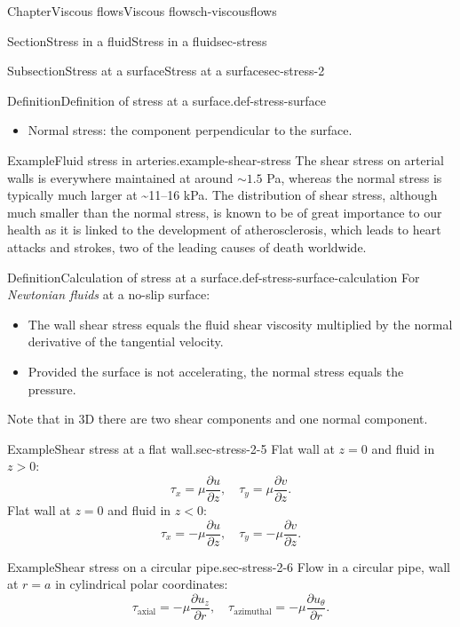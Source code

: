 \documentclass[oneside,10pt,]{book}
\newcommand{\ptxlistdisc}{\raisebox{0.3ex}{\textbullet}}
\numberwithin{equation}{section}
\newcommand{\pd}[2]{\frac{\partial#1}{\partial#2}}
\begin{document}
\begin{chapterptx}{Chapter}{Viscous flows}{}{Viscous flows}{}{}{ch-viscousflows}
\begin{sectionptx}{Section}{Stress in a fluid}{}{Stress in a fluid}{}{}{sec-stress}
\begin{subsectionptx}{Subsection}{Stress at a surface}{}{Stress at a surface}{}{}{sec-stress-2}
\begin{definition}{Definition}{Definition of stress at a surface.}{}{def-stress-surface}
\begin{itemize}[label=\ptxlistdisc]
\item{}Normal stress: the component perpendicular to the surface.%
\end{itemize}
%
\end{definition}
\begin{example}{Example}{Fluid stress in arteries.}{example-shear-stress}%
The shear stress on arterial walls is everywhere maintained at around \(\sim1.5\) Pa, whereas the normal stress is typically much larger at \textasciitilde{}11–16 kPa. The distribution of shear stress, although much smaller than the normal stress, is known to be of great importance to our health as it is linked to the development of atherosclerosis, which leads to heart attacks and strokes, two of the leading causes of death worldwide.%
\end{example}
\begin{definition}{Definition}{Calculation of stress at a surface.}{}{def-stress-surface-calculation}%
For \emph{Newtonian fluids} at a no-slip surface:%
\begin{itemize}[label=\ptxlistdisc]
\item{}The wall shear stress equals the fluid shear viscosity multiplied by the normal derivative of the tangential velocity.%
\item{}Provided the surface is not accelerating, the normal stress equals the pressure.%
\end{itemize}
Note that in 3D there are two shear components and one normal component.%
\end{definition}
\begin{example}{Example}{Shear stress at a flat wall.}{sec-stress-2-5}%
Flat wall at \(z=0\) and fluid in \(z>0\):%
\begin{equation*}
\tau_x = \mu\pd{u}{z},\quad \tau_y = \mu\pd{v}{z}.
\end{equation*}
Flat wall at \(z=0\) and fluid in \(z<0\):%
\begin{equation*}
\tau_x = -\mu\pd{u}{z},\quad \tau_y = -\mu\pd{v}{z}.
\end{equation*}
%
\end{example}
\begin{example}{Example}{Shear stress on a circular pipe.}{sec-stress-2-6}%
Flow in a circular pipe, wall at \(r=a\) in cylindrical polar coordinates:%
\begin{equation*}
\tau_{\textrm{axial}} = -\mu\pd{u_z}{r},\quad
\tau_{\textrm{azimuthal}} = -\mu\pd{u_{\theta}}{r}.
\end{equation*}
%
\end{example}

\end{subsectionptx}
\end{sectionptx}
\end{chapterptx}
\end{document}
